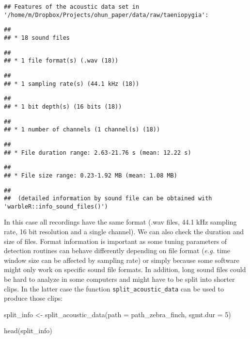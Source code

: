 \documentclass[
]{article}
\newenvironment{Shaded}{\begin{snugshade}}{\end{snugshade}}
\newcommand{\AttributeTok}[1]{\textcolor[rgb]{0.77,0.63,0.00}{#1}}
\newcommand{\DecValTok}[1]{\textcolor[rgb]{0.00,0.00,0.81}{#1}}
\newcommand{\FunctionTok}[1]{\textcolor[rgb]{0.00,0.00,0.00}{#1}}
\newcommand{\NormalTok}[1]{#1}
\newcommand{\OtherTok}[1]{\textcolor[rgb]{0.56,0.35,0.01}{#1}}
\begin{document}
\begin{verbatim}
## Features of the acoustic data set in '/home/m/Dropbox/Projects/ohun_paper/data/raw/taeniopygia':
\end{verbatim}

\begin{verbatim}
## 
## * 18 sound files
\end{verbatim}

\begin{verbatim}
## 
## * 1 file format(s) (.wav (18))
\end{verbatim}

\begin{verbatim}
## 
## * 1 sampling rate(s) (44.1 kHz (18))
\end{verbatim}

\begin{verbatim}
## 
## * 1 bit depth(s) (16 bits (18))
\end{verbatim}

\begin{verbatim}
## 
## * 1 number of channels (1 channel(s) (18))
\end{verbatim}

\begin{verbatim}
## 
## * File duration range: 2.63-21.76 s (mean: 12.22 s)
\end{verbatim}

\begin{verbatim}
## 
## * File size range: 0.23-1.92 MB (mean: 1.08 MB)
\end{verbatim}

\begin{verbatim}
## 
##  (detailed information by sound file can be obtained with 'warbleR::info_sound_files()')
\end{verbatim}

In this case all recordings have the same format (.wav files, 44.1 kHz
sampling rate, 16 bit resolution and a single channel). We can also
check the duration and size of files. Format information is important as
some tuning parameters of detection routines can behave differently
depending on file format (\emph{e.g.} time window size can be affected
by sampling rate) or simply because some software might only work on
specific sound file formats. In addition, long sound files could be hard
to analyze in some computers and might have to be split into shorter
clips. In the latter case the function \texttt{split\_acoustic\_data}
can be used to produce those clips:

\begin{Shaded}
\begin{Highlighting}[]
\NormalTok{split\_info }\OtherTok{\textless{}{-}} \FunctionTok{split\_acoustic\_data}\NormalTok{(}\AttributeTok{path =}\NormalTok{ path\_zebra\_finch, }\AttributeTok{sgmt.dur =} \DecValTok{5}\NormalTok{)}

\FunctionTok{head}\NormalTok{(split\_info)}
\end{Highlighting}
\end{Shaded}
\end{document}
